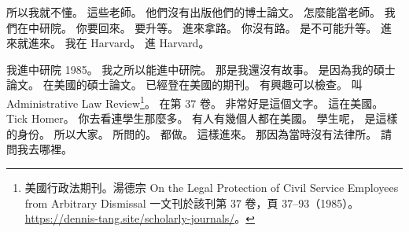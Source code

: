 \hypertarget{c01:cue:3820}{}所以我就不懂。
\hypertarget{c01:cue:3821}{}這些老師。
\hypertarget{c01:cue:3822}{}他們沒有出版他們的博士論文。
\hypertarget{c01:cue:3823}{}怎麼能當老師。
\hypertarget{c01:cue:3824}{}我們在中研院。
\hypertarget{c01:cue:3825}{}你要回來。
\hypertarget{c01:cue:3826}{}要升等。
\hypertarget{c01:cue:3827}{}進來拿路。
\hypertarget{c01:cue:3828}{}你沒有路。
\hypertarget{c01:cue:3829}{}是不可能升等。
\hypertarget{c01:cue:3830}{}進來就進來。
\hypertarget{c01:cue:3831}{}我在 Harvard。
\hypertarget{c01:cue:3832}{}進 Harvard。

\hypertarget{c01:cue:3833}{}我進中研院 1985。
\hypertarget{c01:cue:3834}{}我之所以能進中研院。
\hypertarget{c01:cue:3835}{}那是我還沒有故事。
\hypertarget{c01:cue:3836}{}是因為我的碩士論文。
\hypertarget{c01:cue:3837}{}在美國的碩士論文。
\hypertarget{c01:cue:3838}{}已經登在美國的期刊。
\hypertarget{c01:cue:3839}{}有興趣可以檢查。
\hypertarget{c01:cue:3840}{}叫 Administrative Law Review\footnote{美國行政法期刊。湯德宗 On the Legal Protection of Civil Service Employees from Arbitrary Dismissal 一文刊於該刊第 37 卷，頁 37–93（1985）。\url{https://dennis-tang.site/scholarly-journals/}。}。
\hypertarget{c01:cue:3841}{}在第 37 卷。
\hypertarget{c01:cue:3842}{}非常好是這個文字。
\hypertarget{c01:cue:3843}{}這在美國。
\hypertarget{c01:cue:3844}{}Tick Homer。
\hypertarget{c01:cue:3845}{}你去看連學生那麼多。
\hypertarget{c01:cue:3846}{}有人有幾個人都在美國。
\hypertarget{c01:cue:3847}{}學生呢，
\hypertarget{c01:cue:3848}{}是這樣的身份。
\hypertarget{c01:cue:3849}{}所以大家。
\hypertarget{c01:cue:3850}{}所問的。
\hypertarget{c01:cue:3851}{}都做。
\hypertarget{c01:cue:3852}{}這樣進來。
\hypertarget{c01:cue:3853}{}那因為當時沒有法律所。
\hypertarget{c01:cue:3854}{}請問我去哪裡。

